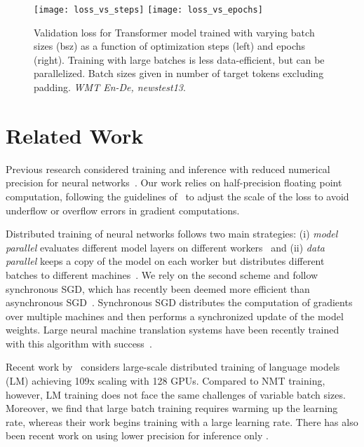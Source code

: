 \documentclass[11pt,a4paper]{article}
\begin{document}
\begin{figure*}
\centering
\texttt{[image: loss\_vs\_steps]}
\quad
\texttt{[image: loss\_vs\_epochs]}
\quad
\caption{Validation loss for Transformer model trained with varying batch sizes (bsz) as a function of optimization steps (left) and epochs (right). Training with large batches is less data-efficient, but can be parallelized. Batch sizes given in number of target tokens excluding padding. \emph{WMT En-De, newstest13}.}
\label{fig:loss_vs_steps_epochs}
\end{figure*}

\section{Related Work}

Previous research considered training and inference with reduced
numerical precision for neural networks~\cite{simard1993nips,courbariaux2015iclr,sa2018lowprec}.
Our work relies on half-precision floating point computation, following the guidelines of~\citet{narang2018iclr} to adjust the scale of the loss to avoid underflow or overflow errors in gradient computations.

Distributed training of neural networks follows two main strategies:
(i) \emph{model parallel} evaluates different model layers on different workers~\citep{coates2013hpc} and (ii) \emph{data parallel} keeps a copy of the model on each worker but distributes different batches to different machines~\citep{dean2012distributed}.
We rely on the second scheme and follow synchronous SGD, which has recently been deemed more efficient than asynchronous SGD~\citep{chen2016distributed}. Synchronous SGD distributes the computation of gradients over multiple machines and then performs a synchronized update of the model weights. Large neural machine translation systems have been recently trained with this algorithm with success~\cite{dean2017nipsw,chen2018arxiv}.

Recent work by~\citet{puri2018large} considers large-scale distributed training of language models (LM) achieving 109x scaling with 128 GPUs.
Compared to NMT training, however, LM training does not face the same challenges of variable batch sizes.
Moreover, we find that large batch training requires warming up the learning rate, whereas their work begins training with a large learning rate.
There has also been recent work on using lower precision for inference only \cite{quinn2018bit}.
\end{document}
